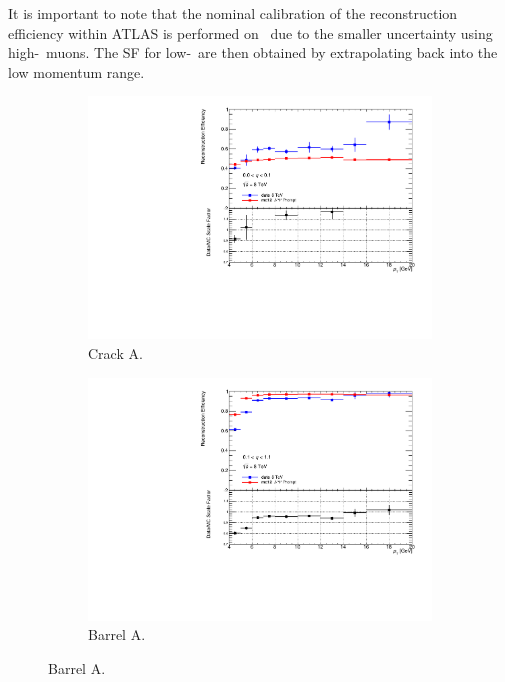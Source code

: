 It is important to note that the nominal calibration of the reconstruction efficiency within ATLAS is performed on \ZMu\ due to the smaller uncertainty using high-\pt\ muons. The SF for low-\pt\ are then obtained by extrapolating back into the low momentum range.

\begin{figure}[htbp]
  \centering
  \begin{subfigure}[b]{0.45\textwidth}
    \includegraphics[width=\textwidth]{PartCalibration2012/Plots/SFPlots/Crack_A_reco.pdf}
    \caption{Crack A.} \label{fig:CalibrationRecoSFCrackA}
  \end{subfigure}
  \hfill
  \begin{subfigure}[b]{0.45\textwidth}
    \includegraphics[width=\textwidth]{PartCalibration2012/Plots/SFPlots/Barrel_A_reco.pdf}
    \caption{Barrel A.} \label{fig:CalibrationRecoSFBarrelA}
  \end{subfigure}


\end{figure}
